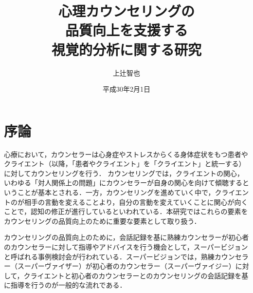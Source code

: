 \documentclass[shuuron]{kuee}
\title{心理カウンセリングの\\品質向上を支援する\\視覚的分析に関する研究}
\author{上辻智也}
\date{平成30年2月1日}
\begin{document}
\maketitle
\tableofcontents

%   

\chapter{序論}

心療において，カウンセラーは心身症やストレスからくる身体症状をもつ患者やクライエント（以降，「患者やクライエント」を「クライエント」と統一する）に対してカウンセリングを行う．%
カウンセリングでは，クライエントの関心，いわゆる「対人関係上の問題」にカウンセラーが自身の関心を向けて傾聴するということが基本とされる\cite{zokad}．一方，カウンセリングを進めていく中で，クライエントのが相手の言動を変えることより，自分の言動を変えていくことに関心が向くことで，認知の修正が進行しているといわれている\cite{Darshana}．本研究ではこれらの要素をカウンセリングの品質向上のために重要な要素として取り扱う．



カウンセリングの品質向上のために，会話記録を基に熟練カウンセラーが初心者のカウンセラーに対して指導やアドバイスを行う機会として，スーパービジョンと呼ばれる事例検討会が行われている．スーパービジョンでは，熟練カウンセラー（スーパーヴァイザー）が初心者のカウンセラー（スーパーヴァイジー）に対して，クライエントと初心者のカウンセラーとのカウンセリングの会話記録を基に指導を行うのが一般的な流れである．%
\end{document}
